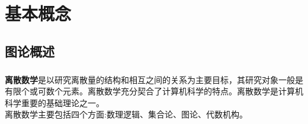 \documentclass[11pt,a4paper,openany]{book}
\begin{document}
\chapter{基本概念}
\section{图论概述}
\paragraph{}\textbf{离散数学}是以研究离散量的结构和相互之间的关系为主要目标，其研究对象一般是有限个或可数个元素。离散数学充分契合了计算机科学的特点。离散数学是计算机科学重要的基础理论之一。\\
离散数学主要包括四个方面:数理逻辑、集合论、图论、代数机构。\\
\end{document}
